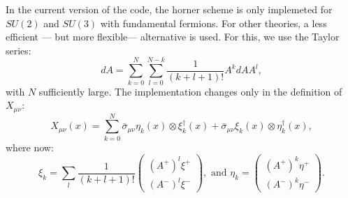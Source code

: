 \documentclass[12pt]{article}
\begin{document}
In the current version of  the code, the horner scheme is only implemeted for $SU(2)$ and $SU(3)$ with fundamental fermions. For other theories, a less efficient  --- but more flexible--- alternative is used. For this, we use the Taylor series:
\begin{equation}
dA = \sum_{k=0}^N \sum_{l=0}^{N-k} \frac{1}{(k+l+1)!} A^{k} dA A^{l},
\end{equation}
with $N$ sufficiently large. The implementation changes only in the definition of $X_{\mu\nu}$:
\begin{equation}
 X_{\mu\nu}(x) = \sum_{k=0}^N \bar{\sigma}_{\mu\nu}\eta_k(x)\otimes\xi_k^\dagger(x) + \bar{\sigma}_{\mu\nu}\xi_k(x)\otimes\eta_k^\dagger(x),
\end{equation}
where now:
\begin{equation}
\xi_k = \sum_l \frac{1}{(k+l+1)!} \begin{pmatrix}
(A^+)^l \xi^+ \\
 (A^-)^l \xi^-
\end{pmatrix}, \text{ and } 
\eta_k =  \begin{pmatrix}
 (A^+)^k \eta^+ \\
(A^-)^k \eta^-
\end{pmatrix}.
\end{equation}
\end{document}
